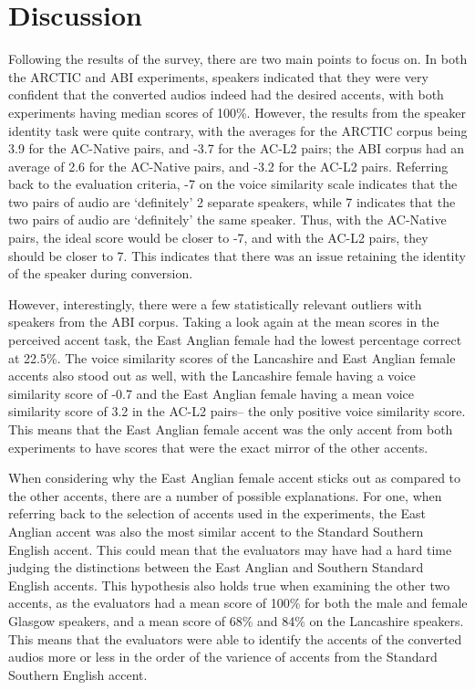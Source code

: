 \documentclass
[
    a4paper,
    twoside,
    12pt,
]
{report}
\begin{document}
\hypertarget{discussion}{%
\section{Discussion}\label{discussion}}

Following the results of the survey, there are two main points to focus
on. In both the ARCTIC and ABI experiments, speakers indicated that they
were very confident that the converted audios indeed had the desired
accents, with both experiments having median scores of 100\%. However,
the results from the speaker identity task were quite contrary, with the
averages for the ARCTIC corpus being 3.9 for the AC-Native pairs, and
-3.7 for the AC-L2 pairs; the ABI corpus had an average of 2.6 for the
AC-Native pairs, and -3.2 for the AC-L2 pairs. Referring back to the
evaluation criteria, -7 on the voice similarity scale indicates that the
two pairs of audio are `definitely' 2 separate speakers, while 7
indicates that the two pairs of audio are `definitely' the same speaker.
Thus, with the AC-Native pairs, the ideal score would be closer to -7,
and with the AC-L2 pairs, they should be closer to 7. This indicates
that there was an issue retaining the identity of the speaker during
conversion.

However, interestingly, there were a few statistically relevant outliers
with speakers from the ABI corpus. Taking a look again at the mean
scores in the perceived accent task, the East Anglian female had the
lowest percentage correct at 22.5\%. The voice similarity scores of the
Lancashire and East Anglian female accents also stood out as well, with
the Lancashire female having a voice similarity score of -0.7 and the
East Anglian female having a mean voice similarity score of 3.2 in the
AC-L2 pairs-- the only positive voice similarity score. This means that
the East Anglian female accent was the only accent from both experiments
to have scores that were the exact mirror of the other accents.

When considering why the East Anglian female accent sticks out as
compared to the other accents, there are a number of possible
explanations. For one, when referring back to the selection of accents
used in the experiments, the East Anglian accent was also the most
similar accent to the Standard Southern English accent. This could mean
that the evaluators may have had a hard time judging the distinctions
between the East Anglian and Southern Standard English accents. This
hypothesis also holds true when examining the other two accents, as the
evaluators had a mean score of 100\% for both the male and female
Glasgow speakers, and a mean score of 68\% and 84\% on the Lancashire
speakers. This means that the evaluators were able to identify the
accents of the converted audios more or less in the order of the
varience of accents from the Standard Southern English accent.
\end{document}
